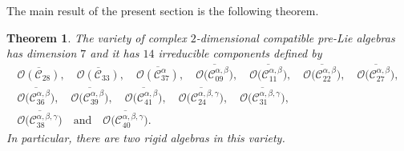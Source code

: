 \documentclass[10pt,a4paper]{amsart}
\numberwithin{equation}{section}
\newtheorem{Theorem}{Theorem}[section]
\begin{document}
The main result of the present section is the following theorem.


\begin{Theorem}\label{geo4}
The variety of complex $2$-dimensional compatible pre-Lie algebras has
dimension $7$ and it has $14$ irreducible components defined by
\begin{gather*}
 \overline{\mathcal{O}( \mathcal{C}_{28})} , \quad
 \overline{\mathcal{O}( \mathcal{C}_{33})} , \quad
 \overline{ \mathcal{O}(\mathcal{C}_{37}^\alpha)} ,
\quad \overline{ \mathcal{O}\bigl(\mathcal{C}_{09}^{\alpha,\beta}\bigr)} ,
\quad \overline{ \mathcal{O}\bigl(\mathcal{C}_{11}^{\alpha,\beta}\bigr)} ,
\quad \overline{ \mathcal{O}\bigl(\mathcal{C}_{22}^{\alpha,\beta}\bigr)} ,
\quad\overline{ \mathcal{O}\bigl(\mathcal{C}_{27}^{\alpha,\beta}\bigr)} ,
\\ \overline{ \mathcal{O}\bigl(\mathcal{C}_{36}^{\alpha,\beta}\bigr)} ,
\quad \overline{ \mathcal{O}\bigl(\mathcal{C}_{39}^{\alpha,\beta}\bigr)} ,
\quad \overline{ \mathcal{O}\bigl(\mathcal{C}_{41}^{\alpha,\beta}\bigr)} ,
\quad \overline{ \mathcal{O}\bigl(\mathcal{C}_{24}^{\alpha,\beta,\gamma}\bigr)} ,
\quad \overline{ \mathcal{O}\bigl(\mathcal{C}_{31}^{\alpha,\beta,\gamma}\bigr)} ,
\\ \overline{\mathcal{O}\bigl(\mathcal{C}_{38}^{\alpha,\beta,\gamma}\bigr)} \quad \text{and}
\quad \overline{ \mathcal{O}\bigl(\mathcal{C}_{40}^{\alpha,\beta,\gamma}\bigr)}.
 \end{gather*}
 In particular, there are two rigid algebras in this variety.

\end{Theorem}
\end{document}
